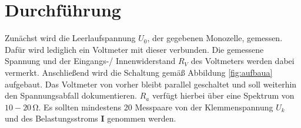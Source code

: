 \section{Durchführung}
\label{sec:Durchführung}

Zunächst wird die Leerlaufspannung $U_0$, der gegebenen Monozelle, gemessen.
Dafür wird lediglich ein Voltmeter mit dieser verbunden.
Die gemessene Spannung und der Eingangs-/ Innenwiderstand $R_V$ des Voltmeters werden dabei vermerkt.
Anschließend wird die Schaltung gemäß Abbildung \ref{fig:aufbaua} aufgebaut.
Das Voltmeter von vorher bleibt parallel geschaltet und soll weiterhin den Spannungsabfall dokumentieren.
$R_a$ verfügt hierbei über eine Spektrum von $10 - 20\,\si{\ohm}$.
Es sollten mindestens 20 Messpaare von der Klemmenspannung $U_k$ und des Belastungsstroms \textbf{I} genommen werden.

